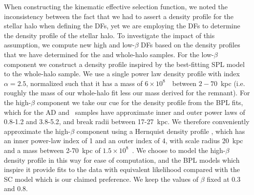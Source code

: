 When constructing the kinematic effective selection function, we noted the inconsistency between the fact that we had to assert a density profile for the stellar halo when defining the DFs, yet we are employing the DFs to determine the density profile of the stellar halo. To investigate the impact of this assumption, we compute new high and low-$\beta$ DFs based on the density profiles that we have determined for the \gse and whole-halo samples. For the low-$\beta$ component we construct a density profile inspired by the best-fitting SPL model to the whole-halo sample. We use a single power law density profile with index $\alpha=2.5$, normalized such that it has a mass of $6\times10^{8}$~\Msun\ between $2-70$~kpc (i.e. roughly the mass of our whole-halo fit less our mass derived for the \gse remnant). For the high-$\beta$ component we take our cue for the density profile from the BPL fits, which for the AD and \eLz\ samples have approximate inner and outer power laws of 0.8-1.2 and 3.8-5.2, and break radii between 17-27~kpc. We therefore conveniently approximate the high-$\beta$ component using a Hernquist density profile \parencite{hernquist90}, which has an inner power-law index of 1 and an outer index of 4, with scale radius 20~kpc and a mass between 2-70~kpc of $1.5\times10^{8}$~\Msun. We choose to model the high-$\beta$ density profile in this way for ease of computation, and the BPL models which inspire it provide fits to the data with equivalent likelihood compared with the SC model which is our claimed preference. We keep the values of $\beta$ fixed at 0.3 and 0.8.

